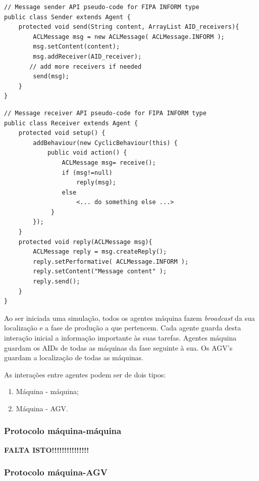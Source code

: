 \begin{titlepage}
\begin{lstlisting}
// Message sender API pseudo-code for FIPA INFORM type
public class Sender extends Agent {
	protected void send(String content, ArrayList AID_receivers){
		ACLMessage msg = new ACLMessage( ACLMessage.INFORM );
		msg.setContent(content);
		msg.addReceiver(AID_receiver); 
       // add more receivers if needed
		send(msg);
    }
}
\end{lstlisting}

\begin{lstlisting}
// Message receiver API pseudo-code for FIPA INFORM type
public class Receiver extends Agent {
	protected void setup() {
    	addBehaviour(new CyclicBehaviour(this) {
        	public void action() {
            	ACLMessage msg= receive();
                if (msg!=null)
                	reply(msg);
                else
					<... do something else ...>
             }
		});
	}
    protected void reply(ACLMessage msg){
    	ACLMessage reply = msg.createReply();
        reply.setPerformative( ACLMessage.INFORM );
        reply.setContent("Message content" );
        reply.send();
    }
}
\end{lstlisting}

Ao ser iniciada uma simulação, todos os agentes máquina fazem \textit{broadcast} da sua localização e a fase de produção a que pertencem. Cada agente guarda desta interação inicial a informação importante às suas tarefas. Agentes máquina guardam os AIDs de todas as máquinas da fase seguinte à sua. Os AGV's guardam a localização de todas as máquinas.\newline

As interações entre agentes podem ser de dois tipos:

\begin{enumerate}
\item Máquina - máquina;
\item Máquina - AGV.
\end{enumerate}

\subsubsection{Protocolo máquina-máquina}

\textbf{FALTA ISTO!!!!!!!!!!!!!!!}

\subsubsection{Protocolo máquina-AGV}


\end{titlepage}

